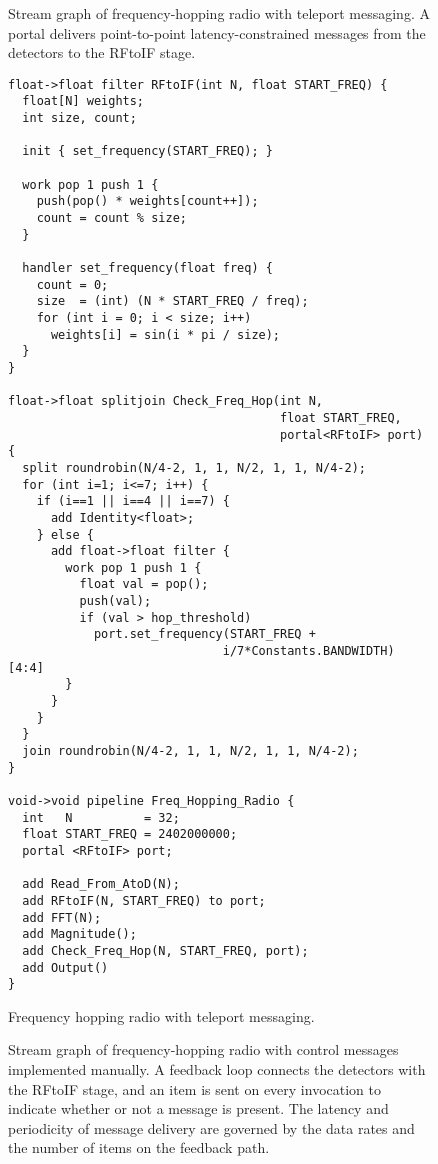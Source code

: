 \clearpage
\begin{figure}[t]
\caption{\small Stream graph of frequency-hopping radio with teleport messaging.  
A portal delivers point-to-point latency-constrained messages from the
detectors to the RFtoIF stage.
\protect\label{fig:fhr-streamit}}
\end{figure}

\begin{figure}[t]
\scriptsize
\begin{verbatim}
float->float filter RFtoIF(int N, float START_FREQ) {
  float[N] weights;
  int size, count;
  
  init { set_frequency(START_FREQ); }
  
  work pop 1 push 1 {
    push(pop() * weights[count++]);
    count = count % size;
  }
  
  handler set_frequency(float freq) {
    count = 0;
    size  = (int) (N * START_FREQ / freq);
    for (int i = 0; i < size; i++)
      weights[i] = sin(i * pi / size);
  }
}

float->float splitjoin Check_Freq_Hop(int N, 
                                      float START_FREQ, 
                                      portal<RFtoIF> port) {
  split roundrobin(N/4-2, 1, 1, N/2, 1, 1, N/4-2);
  for (int i=1; i<=7; i++) {
    if (i==1 || i==4 || i==7) {
      add Identity<float>;
    } else {
      add float->float filter {
        work pop 1 push 1 {
          float val = pop();
          push(val);
          if (val > hop_threshold)
            port.set_frequency(START_FREQ +
                              i/7*Constants.BANDWIDTH) [4:4]
        }
      }
    }
  }
  join roundrobin(N/4-2, 1, 1, N/2, 1, 1, N/4-2);
}

void->void pipeline Freq_Hopping_Radio {
  int   N          = 32;
  float START_FREQ = 2402000000;
  portal <RFtoIF> port;

  add Read_From_AtoD(N);
  add RFtoIF(N, START_FREQ) to port;
  add FFT(N);
  add Magnitude();
  add Check_Freq_Hop(N, START_FREQ, port);
  add Output()
}
\end{verbatim}
\vspace{-12pt}
\caption{\small Frequency hopping radio with teleport messaging. \protect\label{fig:freq1}}
\end{figure}

\clearpage
\begin{figure}[t]
\caption{\small Stream graph of frequency-hopping radio with control
messages implemented manually.  A feedback loop connects the detectors
with the RFtoIF stage, and an item is sent on every invocation to
indicate whether or not a message is present.  The latency and
periodicity of message delivery are governed by the data rates and the
number of items on the feedback
path. \protect\label{fig:fhr-manual}}
\end{figure}

